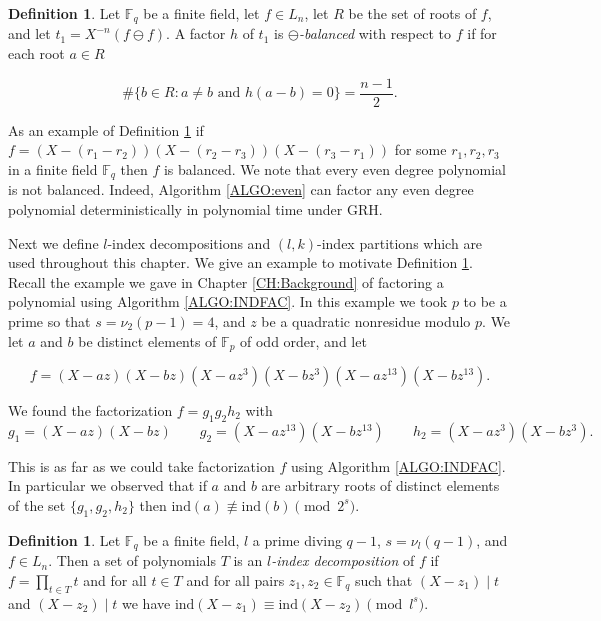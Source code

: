 \documentclass{article}
\newcounter{dummy} \numberwithin{dummy}{section}
\theoremstyle{plain}
\theoremstyle{definition}
\newtheorem{mydef}[dummy]{Definition}
\def\Fp {{ \mathbb{F} _ {p} }}
\def\Fq {{ \mathbb{F} _ {q} }}
\def\ind {{ \mathrm{ind} }}
\begin{document}
		\begin{mydef}
		\label{DEF:DiffBalanced}
		    Let $\Fq$ be a finite field, let $f \in L_n$, let $R$ be the set of roots of $f$, and let $t_1=X^{-n}(f \ominus f)$. A factor $h$ of $t_1$ is \emph{$\ominus$-balanced} with respect to $f$ if for each root $a \in R$
			    
				\[    {\#} \{ b \in R : a \not= b \textrm{ and } h(a - b)=0 \} = \frac{n-1}{2}. \]
				 
		\end{mydef}
		
		As an example of Definition \ref{DEF:DiffBalanced} if $f=(X-(r_1-r_2))(X-(r_2-r_3))(X-(r_3-r_1))$ for some $r_1,r_2,r_3$ in a finite field $\Fq$ then $f$ is balanced. We note that every even degree polynomial is not balanced. Indeed, Algorithm \ref{ALGO:even} can factor any even degree polynomial deterministically in polynomial time under GRH.
		
		Next we define $l$-index decompositions and $(l,k)$-index partitions which are used throughout this chapter. We give an example to motivate Definition \ref{DEF:IndexDecomposition}. Recall the example we gave in Chapter \ref{CH:Background} of factoring a polynomial using Algorithm \ref{ALGO:INDFAC}. In this example we took $p$ to be a prime so that $s=\nu_2(p-1)=4$, and $z$ be a quadratic nonresidue modulo $p$. We let $a$ and $b$ be distinct elements of $\Fp$ of odd order, and let
		
	  \[ f=(X-az)(X-bz)(X-az^3)(X-bz^3)(X-az^{13})(X-bz^{13}). \]

		We found the factorization $f=g_1 g_2 h_2$ with
		\[ 
		    g_1=(X-az)(X-bz) \quad\quad
				g_2=(X-az^{13})(X-bz^{13}) \quad\quad
				h_2=(X-az^3)(X-bz^3).
		\]
		
		This is as far as we could take factorization $f$ using Algorithm \ref{ALGO:INDFAC}. In particular we observed that if $a$ and $b$ are arbitrary roots of distinct elements of the set $\{ g_1,g_2,h_2 \}$ then $\ind(a) \not\equiv \ind(b) \pmod{2^s}.$ 
		
		\begin{mydef}
		\label{DEF:IndexDecomposition}
		    Let $\Fq$ be a finite field, $l$ a prime diving $q-1$, $s=\nu_l(q-1)$, and $f \in L_n$. Then a set of polynomials $T$ is an \emph{$l$-index decomposition} of $f$ if $f=\prod_{t \in T}{t}$ and for all $t \in T$ and for all pairs $z_1,z_2 \in \Fq$ such that $(X-z_1) \mid t$ and $(X-z_2) \mid t$ we have $\ind(X-z_1) \equiv \ind(X-z_2) \pmod {l^s}$. 
		\end{mydef}
		
\end{document}
